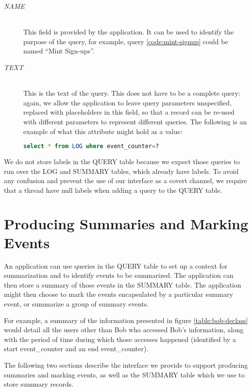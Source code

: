 \begin{description}
  \item[\emph{NAME}] \ \\
    This field is provided by the application. It
    can be used to identify the purpose of the query,
    for example, query \ref{code:mint-signup}
    could be named ``Mint Sign-ups''.
  \item[\emph{TEXT}] \ \\
    This is the text of the query. This does
    not have to be a complete query: again, we allow the
    application to leave query parameters unspecified,
    replaced with placeholders in this field,
    so that a record can be re-used with different
    parameters to represent different queries.
    The following is an example of what this
    attribute might hold as a value:

\begin{lstlisting}[language=SQL, deletendkeywords={TIMESTAMP}]
select * from LOG where event_counter=?
\end{lstlisting}

\end{description}

\noindent
We do not store labels in the QUERY table because we expect those queries to run over the LOG and SUMMARY tables, which already have labels. To avoid any confusion and prevent the use of our interface as a covert channel, we require that a thread have null labels when adding a query to the QUERY table.

\section{Producing Summaries and Marking Events}
\label{model:summaries}
An application can use queries in the QUERY table to set up a context for summarization and to identify events to be summarized. The application can then store a summary of those events in the SUMMARY table. The application might then choose to mark the events encapsulated by a particular summary event, or summarize a group of summary events.

For example, a summary of the information presented in figure \ref{table:bob-declass} would detail all the users other than Bob who accessed Bob's information, along with the period of time during which those accesses happened (identified by a start event\_counter and an end event\_counter).

The following two sections describe the interface we provide to support producing summaries and marking events, as well as the SUMMARY table which we use to store summary records.

